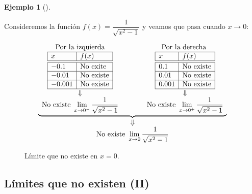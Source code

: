 \documentclass[
  a4paper,
]{scrreport}
\theoremstyle{plain}
\theoremstyle{plain}
\theoremstyle{definition}
\theoremstyle{plain}
\theoremstyle{definition}
\newtheorem{example}{Ejemplo}[chapter]
\theoremstyle{remark}
\begin{document}
\leavevmode{}%
\begin{example}[]\label{exm-limites-no-existen}

Consideremos la función \(f(x)=\dfrac{1}{\sqrt{x^2-1}}\) y veamos que
pasa cuando \(x\to 0\):

\[
\begin{array}{c}
\underbrace{\begin{array}{ccc}
\textrm{Por la izquierda} & \qquad & \textrm{Por la derecha }\\
\begin{array}{|l|l|}
\hline
x      & f(x)   \\
\hline\hline
 -0.1   & \textrm{No exite}      \\
\hline
 -0.01   & \textrm{No existe}     \\
\hline
 -0.001  & \textrm{No existe}   \\
\hline
\end{array}
& &
\begin{array}{|l|l|}
\hline
x      & f(x)   \\
\hline\hline
 0.1    &  \textrm{No existe}      \\
\hline
 0.01   & \textrm{No existe}    \\
\hline
 0.001  & \textrm{No existe}   \\
\hline
\end{array}\\
\Downarrow & & \Downarrow\\
\displaystyle \textrm{No existe } \lim_{x\to 0^-}\frac{1}{\sqrt{x^2-1}}
& &
\displaystyle \textrm{No existe } \lim_{x\to 0^+}\frac{1}{\sqrt{x^2-1}}
\end{array}}\\
\Downarrow\\
\displaystyle \textrm{No existe }\lim_{x\to 0}\frac{1}{\sqrt{x^2-1}}
\end{array}\]

\begin{figure}

{\centering 



}

\caption{Límite que no existe en \(x=0\).}

\end{figure}

\end{example}

\hypertarget{luxedmites-que-no-existen-ii}{%
\subsection{Límites que no existen
(II)}\label{luxedmites-que-no-existen-ii}}
\end{document}
